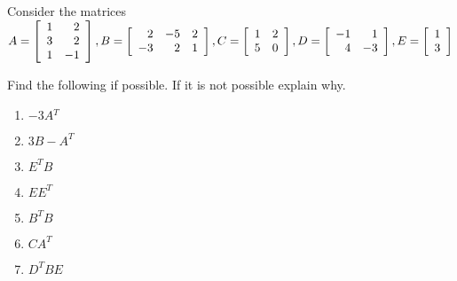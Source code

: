 \begin{enumialphparenastyle}

\begin{ex} Consider the matrices $
A =\left[
\begin{array}{rr}
1 & 2 \\
3 & 2 \\
1 & -1
\end{array}
\right], B=\left[
\begin{array}{rrr}
2 & -5 & 2 \\
-3 & 2 & 1
\end{array}
\right], 
C =\left[
\begin{array}{rr}
1 & 2 \\
5 & 0
\end{array}
\right], \\ D=\left[
\begin{array}{rr}
-1 & 1 \\
4 & -3
\end{array}
\right], E=\left[
\begin{array}{r}
1 \\
3
\end{array}
\right]$

Find the following if possible. If it is not possible explain why. 
\begin{enumerate}  
\item $-3A{^T}$
\item $3B - A^{T}$
\item $E^{T}B$
\item $EE^{T}$
\item $B^{T}B$
\item $CA^{T}$
\item $D^{T}BE$
\end{enumerate}


\end{ex}
\end{enumialphparenastyle}
